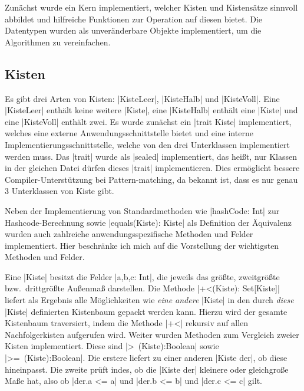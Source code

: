  Zunächst wurde ein Kern implementiert, welcher Kisten und Kistensätze sinnvoll abbildet und hilfreiche Funktionen zur Operation auf diesen bietet.
 Die Datentypen wurden als unveränderbare Objekte implementiert, um die Algorithmen zu vereinfachen.
\subsection{Kisten}
 Es gibt drei Arten von Kisten: |KisteLeer|, |KisteHalb| und |KisteVoll|.
 Eine |KisteLeer| enthält keine weitere |Kiste|, eine |KisteHalb| enthält eine |Kiste| und eine |KisteVoll| enthält zwei.
 Es wurde zunächst ein |trait Kiste| implementiert, welches eine externe Anwendungsschnittstelle bietet und eine interne Implementierungsschnittstelle,
 welche von den drei Unterklassen implementiert werden muss.
 Das |trait| wurde als |sealed| implementiert, das heißt, nur Klassen in der gleichen Datei dürfen dieses |trait| implementieren.
 Dies ermöglicht bessere Compiler-Unterstützung bei Pattern-matching, da bekannt ist, dass es nur genau 3 Unterklassen von Kiste gibt.

 Neben der Implementierung von Standardmethoden wie |hashCode: Int| zur Hashcode-Berechnung sowie |equals(Kiste): Kiste| als Definition der Äquivalenz
  wurden auch zahlreiche anwendungsspezifische Methoden und Felder implementiert.
 Hier beschränke ich mich auf die Vorstellung der wichtigsten Methoden und Felder.

 Eine |Kiste| besitzt die Felder |a,b,c: Int|, die jeweils das größte, zweitgrößte bzw.\ drittgrößte Außenmaß darstellen.
 Die Methode |+<(Kiste): Set[Kiste]| liefert als Ergebnis alle Möglichkeiten wie \emph{eine andere} |Kiste| in den durch \emph{diese} |Kiste| definierten Kistenbaum
  gepackt werden kann. Hierzu wird der gesamte Kistenbaum traversiert, indem die Methode |+<| rekursiv auf allen Nachfolgerkisten aufgerufen wird.
 Weiter wurden Methoden zum Vergleich zweier Kisten implementiert. Diese sind |>~(Kiste):Boolean| sowie |>=~(Kiste):Boolean|.
 Die erstere liefert zu einer anderen |Kiste der|, ob diese hineinpasst.
 Die zweite prüft indes, ob die |Kiste der| kleinere oder gleichgroße Maße hat, also ob |der.a <= a| und |der.b <= b| und |der.c <= c| gilt.
